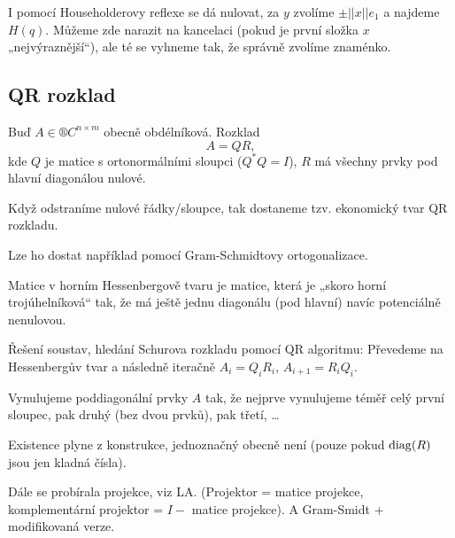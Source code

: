 \documentclass[12pt]{article}					%
\begin{document}
	\begin{poznamka}
		I pomocí Householderovy reflexe se dá nulovat, za $y$ zvolíme $±||x||e_1$ a najdeme $H(q)$. Můžeme zde narazit na kancelaci (pokud je první složka $x$ „nejvýraznější“), ale té se vyhneme tak, že správně zvolíme znaménko.
	\end{poznamka}

	\subsection{QR rozklad}
	\begin{definice}
		Buď $A \in ®C^{n \times m}$ obecně obdélníková. Rozklad
		$$ A = QR, $$
		kde $Q$ je matice s ortonormálními sloupci ($Q^*Q = I$), $R$ má všechny prvky pod hlavní diagonálou nulové.

		Když odstraníme nulové řádky/sloupce, tak dostaneme tzv. ekonomický tvar QR rozkladu.

		\begin{poznamkain}
			Lze ho dostat například pomocí Gram-Schmidtovy ortogonalizace.
		\end{poznamkain}
	\end{definice}

	\begin{definice}
		Matice v horním Hessenbergově tvaru je matice, která je „skoro horní trojúhelníková“ tak, že má ještě jednu diagonálu (pod hlavní) navíc potenciálně nenulovou.
	\end{definice}

	\begin{poznamka}
		Řešení soustav, hledání Schurova rozkladu pomocí QR algoritmu: Převedeme na Hessenbergův tvar a následně iteračně $A_i = Q_iR_i$, $A_{i+1} = R_iQ_i$.
	\end{poznamka}

	\begin{definice}
		Vynulujeme poddiagonální prvky $A$ tak, že nejprve vynulujeme téměř celý první sloupec, pak druhý (bez dvou prvků), pak třetí, …
	\end{definice}

	\begin{poznamka}
		Existence plyne z konstrukce, jednoznačný obecně není (pouze pokud $\operatorname{diag}(R)$ jsou jen kladná čísla).
	\end{poznamka}


	\begin{poznamka}
		Dále se probírala projekce, viz LA. (Projektor = matice projekce, komplementární projektor = $I - $ matice projekce). A Gram-Smidt + modifikovaná verze.
	\end{poznamka}
\end{document}
